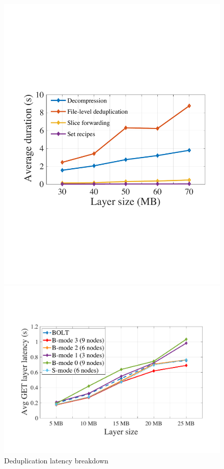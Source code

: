 \begin{figure}[t]
	\centering
	\begin{minipage}{0.3\textwidth}
		\centering
		\includegraphics[width=\textwidth]{graphs/dedupbreakdown.pdf}
		\caption{Deduplication latency breakdown}
		\label{fig:eval-dedupbreakdown}
	\end{minipage}%
	\hspace{1mm}
	\begin{minipage}{0.3\textwidth}
		\centering
		\includegraphics[width=\textwidth]{graphs/dalprimary.pdf}

\end{minipage}
\end{figure}
